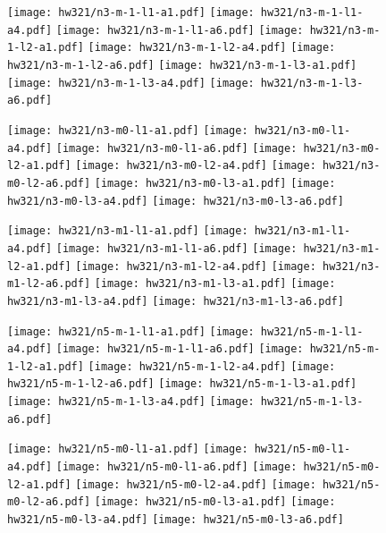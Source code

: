 \documentclass[12pt,letterpaper]{article}
\begin{document}
\begin{figure}
\begin{center}
\texttt{[image: hw321/n3-m-1-l1-a1.pdf]}
\texttt{[image: hw321/n3-m-1-l1-a4.pdf]}
\texttt{[image: hw321/n3-m-1-l1-a6.pdf]}
\texttt{[image: hw321/n3-m-1-l2-a1.pdf]}
\texttt{[image: hw321/n3-m-1-l2-a4.pdf]}
\texttt{[image: hw321/n3-m-1-l2-a6.pdf]}
\texttt{[image: hw321/n3-m-1-l3-a1.pdf]}
\texttt{[image: hw321/n3-m-1-l3-a4.pdf]}
\texttt{[image: hw321/n3-m-1-l3-a6.pdf]}
\end{center}
\end{figure}
\begin{figure}
\begin{center}
\texttt{[image: hw321/n3-m0-l1-a1.pdf]}
\texttt{[image: hw321/n3-m0-l1-a4.pdf]}
\texttt{[image: hw321/n3-m0-l1-a6.pdf]}
\texttt{[image: hw321/n3-m0-l2-a1.pdf]}
\texttt{[image: hw321/n3-m0-l2-a4.pdf]}
\texttt{[image: hw321/n3-m0-l2-a6.pdf]}
\texttt{[image: hw321/n3-m0-l3-a1.pdf]}
\texttt{[image: hw321/n3-m0-l3-a4.pdf]}
\texttt{[image: hw321/n3-m0-l3-a6.pdf]}
\end{center}
\end{figure}
\begin{figure}
\begin{center}
\texttt{[image: hw321/n3-m1-l1-a1.pdf]}
\texttt{[image: hw321/n3-m1-l1-a4.pdf]}
\texttt{[image: hw321/n3-m1-l1-a6.pdf]}
\texttt{[image: hw321/n3-m1-l2-a1.pdf]}
\texttt{[image: hw321/n3-m1-l2-a4.pdf]}
\texttt{[image: hw321/n3-m1-l2-a6.pdf]}
\texttt{[image: hw321/n3-m1-l3-a1.pdf]}
\texttt{[image: hw321/n3-m1-l3-a4.pdf]}
\texttt{[image: hw321/n3-m1-l3-a6.pdf]}
\end{center}
\end{figure}
\begin{figure}
\begin{center}
\texttt{[image: hw321/n5-m-1-l1-a1.pdf]}
\texttt{[image: hw321/n5-m-1-l1-a4.pdf]}
\texttt{[image: hw321/n5-m-1-l1-a6.pdf]}
\texttt{[image: hw321/n5-m-1-l2-a1.pdf]}
\texttt{[image: hw321/n5-m-1-l2-a4.pdf]}
\texttt{[image: hw321/n5-m-1-l2-a6.pdf]}
\texttt{[image: hw321/n5-m-1-l3-a1.pdf]}
\texttt{[image: hw321/n5-m-1-l3-a4.pdf]}
\texttt{[image: hw321/n5-m-1-l3-a6.pdf]}
\end{center}
\end{figure}
\begin{figure}
\begin{center}
\texttt{[image: hw321/n5-m0-l1-a1.pdf]}
\texttt{[image: hw321/n5-m0-l1-a4.pdf]}
\texttt{[image: hw321/n5-m0-l1-a6.pdf]}
\texttt{[image: hw321/n5-m0-l2-a1.pdf]}
\texttt{[image: hw321/n5-m0-l2-a4.pdf]}
\texttt{[image: hw321/n5-m0-l2-a6.pdf]}
\texttt{[image: hw321/n5-m0-l3-a1.pdf]}
\texttt{[image: hw321/n5-m0-l3-a4.pdf]}
\texttt{[image: hw321/n5-m0-l3-a6.pdf]}
\end{center}
\end{figure}
\end{document}
